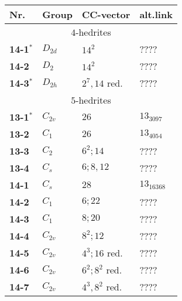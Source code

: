 \documentclass[12pt]{article}
\begin{document}
\begin{table}
\begin{center}
{\scriptsize
\begin{minipage}{7cm}
\begin{tabular}{||l|l|l|l||}
\hline\hline
Nr.     &Group    &CC-vector      &alt.link\\\hline\hline
\multicolumn{4}{||c||}{$4$-hedrites}\\\hline
{\bf 14-1${}^*$}&$D_{2d}$       &$14^2$         &????\\
{\bf 14-2}      &$D_2$  &$14^2$         &????\\ 
{\bf 14-3${}^*$}&$D_{2h}$       &$2^7, 14$ red.  &????\\\hline\hline
\multicolumn{4}{||c||}{$5$-hedrites}\\\hline
{\bf 13-1${}^*$}&$C_{2v}$       &$26$           &$13_{3097}$\\
{\bf 13-2}      &$C_1$  &$26$           &$13_{4054}$\\
{\bf 13-3}      &$C_2$  &$6^2; 14$      &????\\
{\bf 13-4}      &$C_s$  &$6; 8, 12$     &????\\\hline
{\bf 14-1}      &$C_s$  &$28$           &$13_{16368}$\\
{\bf 14-2}      &$C_1$  &$6; 22$                &????\\
{\bf 14-3}      &$C_1$  &$8; 20$                &????\\
{\bf 14-4}      &$C_{2v}$       &$8^2; 12$      &????\\
{\bf 14-5}      &$C_{2v}$       &$4^3; 16$ red. &????\\
{\bf 14-6}      &$C_{2v}$       &$6^2; 8^2$ red.        &????\\
{\bf 14-7}      &$C_{2v}$       &$4^3, 8^2$ red.        &????\\\hline

\end{tabular}
\end{minipage}}
\end{center}
\end{table}
\end{document}
